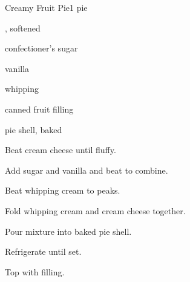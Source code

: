 \begin{recipe}{Creamy Fruit Pie}{}{1 pie}

\begin{ingredients}
\item {} , softened
\item {} confectioner's sugar
\item {} vanilla
\item {} whipping 
\item canned fruit filling
\item pie shell, baked
\end{ingredients}

\begin{directions}
\item Beat cream cheese until fluffy.
\item Add sugar and vanilla and beat to combine.
\item Beat whipping cream to peaks.
\item Fold whipping cream and cream cheese together.
\item Pour mixture into baked pie shell.
\item Refrigerate until set.
\item Top with filling.
\end{directions}

\end{recipe}
